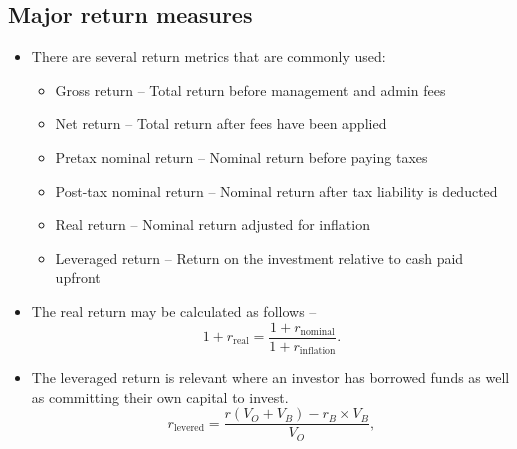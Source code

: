\documentclass[../notes_compiled.tex]{subfiles}
\begin{document}
\subsection{Major return measures}
\begin{itemize}
\item There are several return metrics that are commonly used:
\begin{itemize}
\item Gross return -- Total return before management and admin fees
\item Net return -- Total return after fees have been applied
\item Pretax nominal return -- Nominal return before paying taxes
\item Post-tax nominal return -- Nominal return after tax liability is deducted
\item Real return -- Nominal return adjusted for inflation
\item Leveraged return -- Return on the investment relative to cash paid upfront
\end{itemize}
\item The real return may be calculated as follows -- 
\begin{equation}
1+r_{\text{real}} = \frac{1+r_{\text{nominal}}}{1+r_{\text{inflation}}}.
\end{equation}
\item The leveraged return is relevant where an investor has borrowed funds as well as committing their own capital to invest.
\begin{equation}
r_\text{levered} = \frac{r\left( V_{O}+V_{B}\right)-r_{B}\times V_{B}}{V_{O}},
\end{equation}


\end{itemize}
\end{document}

